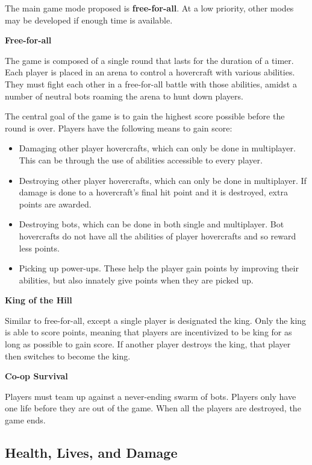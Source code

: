 \documentclass{article}
\theoremstyle{definition}
\begin{document}
The main game mode proposed is \textbf{free-for-all}. At a low priority, other
modes may be developed if enough time is available.

\textbf{Free-for-all}

The game is composed of a single round that lasts for the duration of a timer.
Each player is placed in an arena to control a hovercraft with various
abilities. They must fight each other in a free-for-all battle with those
abilities, amidst a number of neutral bots roaming the arena to hunt down
players.

The central goal of the game is to gain the highest score possible before the
round is over. Players have the following means to gain score:
\begin{itemize}
  \item Damaging other player hovercrafts, which can only be done in
    multiplayer. This can be through the use of abilities accessible to every
    player.
  \item Destroying other player hovercrafts, which can only be done in
    multiplayer. If damage is done to a hovercraft's final hit point and it is
    destroyed, extra points are awarded.
  \item Destroying bots, which can be done in both single and multiplayer.
    Bot hovercrafts do not have all the abilities of player hovercrafts and
    so reward less points.
  \item Picking up power-ups. These help the player gain points by improving
    their abilities, but also innately give points when they are picked up.
\end{itemize}

\textbf{\textbf{King of the Hill}}

Similar to free-for-all, except a single player is designated the king. Only
the king is able to score points, meaning that players are incentivized to be
king for as long as possible to gain score. If another player destroys the
king, that player then switches to become the king.

\textbf{Co-op Survival}

Players must team up against a never-ending swarm of bots. Players only have
one life before they are out of the game. When all the players are destroyed,
the game ends.

\subsection{Health, Lives, and Damage}
\end{document}
